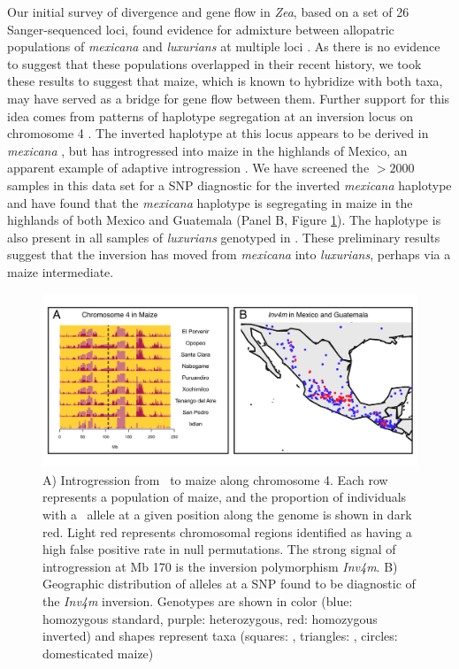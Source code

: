 Our initial survey of divergence and gene flow in \emph{Zea}, based on a set of 26 Sanger-sequenced loci, found evidence for admixture between allopatric populations of \emph{mexicana} and \emph{luxurians} at multiple loci \citep{Ross-Ibarra2009a}. 
As there is no evidence to suggest that these populations overlapped in their recent history, we took these results to suggest that maize, which is known to hybridize with both taxa, may have served as a bridge for gene flow between them.
Further support for this idea comes from patterns of haplotype segregation at an inversion locus on chromosome 4 \citep[\emph{Inv4m};][]{Fang2012,Pyhajarvi2013,Hufford2013}. 
The inverted haplotype at this locus appears to be derived in \emph{mexicana} \citep{Pyhajarvi2013}, but has introgressed into maize in the highlands of Mexico, an apparent example of adaptive introgression \citep[Panel A, Figure \ref{fig:hufmap};][]{Hufford2013}.
We have screened the $>2000$ samples in this data set for a SNP diagnostic for the inverted \emph{mexicana} haplotype and have found that the \emph{mexicana} haplotype is segregating in maize in the highlands of both Mexico and Guatemala (Panel B, Figure \ref{fig:hufmap}).  The haplotype is also present in all samples of \emph{luxurians} genotyped in \citet{Fang2012}.
These preliminary results suggest that the inversion has moved from \emph{mexicana} into \emph{luxurians}, perhaps via a maize intermediate.

\begin{figure}[h!]
  \centering
   \includegraphics[width=1\textwidth]{inv_map.jpg}
    \caption{A) Introgression from \zm\ to maize along chromosome 4.  Each row represents a population of maize, and the proportion of individuals with a \zm\ allele at a given position along the genome is shown in dark red.  Light red represents chromosomal regions identified as having a high false positive rate in null permutations.  The strong signal of introgression at Mb 170 is the inversion polymorphism \emph{Inv4m}. B) Geographic distribution of alleles at a SNP found to be diagnostic of the \emph{Inv4m} inversion.  Genotypes are shown in color (blue: homozygous standard, purple: heterozygous, red: homozygous inverted) and shapes represent taxa (squares: \zm, triangles: \zp, circles: domesticated maize)} 
\label{fig:hufmap}
\end{figure}
